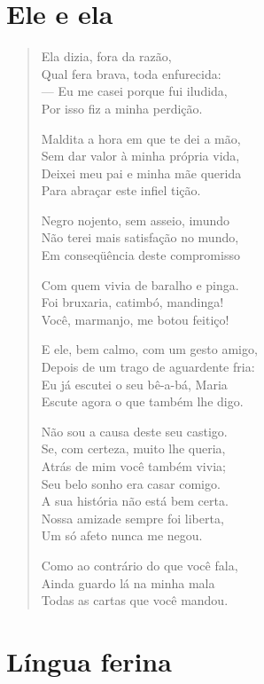 \chapter{Ele e ela}

\begin{verse}
Ela dizia, fora da razão,\\
Qual fera brava, toda enfurecida:\\
--- Eu me casei porque fui iludida,\\
Por isso fiz a minha perdição.

Maldita a hora em que te dei a mão,\\
Sem dar valor à minha própria vida,\\
Deixei meu pai e minha mãe querida\\
Para abraçar este infiel tição.

Negro nojento, sem asseio, imundo\\
Não terei mais satisfação no mundo,\\
Em conseqüência deste compromisso

Com quem vivia de baralho e pinga.\\
Foi bruxaria, catimbó, mandinga!\\
Você, marmanjo, me botou feitiço!

E ele, bem calmo, com um gesto amigo,\\
Depois de um trago de aguardente fria:\\
Eu já escutei o seu bê-a-bá, Maria\\
Escute agora o que também lhe digo.

Não sou a causa deste seu castigo.\\
Se, com certeza, muito lhe queria,\\
Atrás de mim você também vivia;\\
Seu belo sonho era casar comigo.\\
A sua história não está bem certa.\\
Nossa amizade sempre foi liberta,\\
Um só afeto nunca me negou.

Como ao contrário do que você fala,\\
Ainda guardo lá na minha mala\\
Todas as cartas que você mandou.
\end{verse}

\chapter{Língua ferina}

